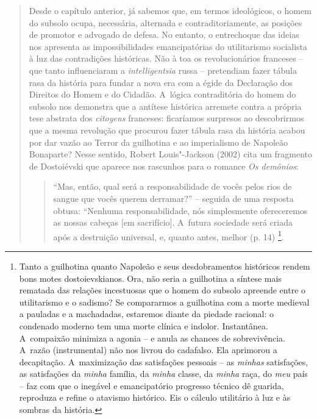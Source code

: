 {\begin{quote}
Desde o capítulo anterior, já sabemos que, em termos ideológicos, o
homem do subsolo ocupa, necessária, alternada e contraditoriamente, as
posições de promotor e advogado de defesa. No entanto, o entrechoque das
ideias nos apresenta as impossibilidades emancipatórias do utilitarismo
socialista à luz das contradições históricas. Não à toa os
revolucionários franceses -- que tanto influenciaram a
\emph{intelligentsia} russa -- pretendiam fazer tábula rasa da história
para fundar a nova era com a égide da Declaração dos Direitos do Homem e
do Cidadão. A~lógica contraditória do homem do subsolo nos demonstra que
a antítese histórica arremete contra a própria tese abstrata dos
\emph{citoyens} franceses: ficaríamos surpresos ao descobrirmos que a
mesma revolução que procurou fazer tábula rasa da história acabou por
dar vazão ao Terror da guilhotina e ao imperialismo de Napoleão
Bonaparte? Nesse sentido, Robert Louis"-Jackson (2002) cita um fragmento
de Dostoiévski que aparece nos rascunhos para o romance \emph{Os
demônios}:

\begin{quote}
``Mas, então, qual será a responsabilidade de vocês pelos rios de sangue
que vocês querem derramar?'' -- seguida de uma resposta obtusa:
``Nenhuma responsabilidade, nós simplesmente ofereceremos as nossas
cabeças {[}em sacrifício{]}. A~futura sociedade será criada após a
destruição universal, e, quanto antes, melhor (p. 14) \footnote{Tanto a
  guilhotina quanto Napoleão e seus desdobramentos históricos rendem
  bons motes dostoievskianos. Ora, não seria a guilhotina a síntese mais
  rematada das relações incestuosas que o homem do subsolo apreende
  entre o utilitarismo e o sadismo? Se compararmos a guilhotina com a
  morte medieval a pauladas e a machadadas, estaremos diante da piedade
  racional: o condenado moderno tem uma morte clínica e indolor.
  Instantânea. A~compaixão minimiza a agonia -- e anula as chances de
  sobrevivência. A~razão (instrumental) não nos livrou do cadafalso. Ela
  aprimorou a decapitação. A~maximização das satisfações pessoais -- as
  \emph{minhas} satisfações, as satisfações da \emph{minha} família, da
  \emph{minha} classe, da \emph{minha} raça, do \emph{meu} país -- faz
  com que o inegável e emancipatório progresso técnico dê guarida,
  reproduza e refine o atavismo histórico. Eis o cálculo utilitário à
  luz e às sombras da história.}.
\end{quote}


\end{quote}}
